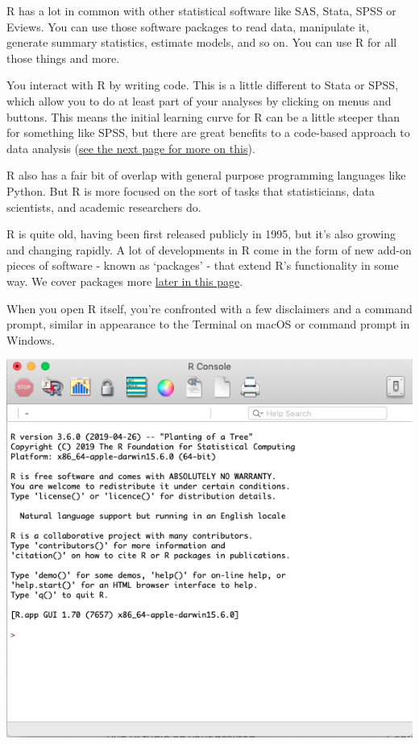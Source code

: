 \documentclass[]{book}
\begin{document}
R has a lot in common with other statistical software like SAS, Stata, SPSS or Eviews. You can use those software packages to read data, manipulate it, generate summary statistics, estimate models, and so on. You can use R for all those things and more.

You interact with R by writing code. This is a little different to Stata or SPSS, which allow you to do at least part of your analyses by clicking on menus and buttons. This means the initial learning curve for R can be a little steeper than for something like SPSS, but there are great benefits to a code-based approach to data analysis (\protect\hyperlink{why-script}{see the next page for more on this}).

R also has a fair bit of overlap with general purpose programming languages like Python. But R is more focused on the sort of tasks that statisticians, data scientists, and academic researchers do.

R is quite old, having been first released publicly in 1995, but it's also growing and changing rapidly. A lot of developments in R come in the form of new add-on pieces of software - known as `packages' - that extend R's functionality in some way. We cover packages more \protect\hyperlink{packages}{later in this page}.

When you open R itself, you're confronted with a few disclaimers and a command prompt, similar in appearance to the Terminal on macOS or command prompt in Windows.

\includegraphics[width=7.99in]{atlas/r_screenshot}
\end{document}
